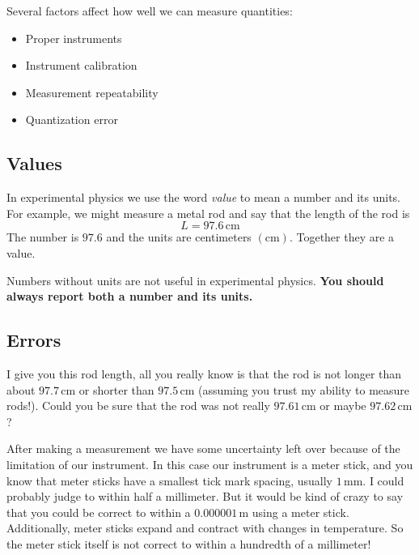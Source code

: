 \documentclass[twoside,11pt,ShortChapTitles]{BYUTextbook}
\begin{document}
Several factors affect how well we can measure quantities:

\begin{itemize}
\item Proper instruments

\item Instrument calibration

\item Measurement repeatability

\item Quantization error
\end{itemize}



\subsection{Values}

In experimental physics we use the word \emph{value} to mean a number and its
units. For example, we might measure a metal rod and say that the length of
the rod is
\[
L=97.6\,\text{cm}
\]
The number is $97.6$ and the units are centimeters $\left(\text{cm}\right)$. Together they are a value.

Numbers without units are not useful in experimental physics. \textbf{You
should always report both a number and its units.}

\subsection{Errors}

I give you this rod length, all you really know is that the rod is not longer
than about $97.7\,\text{cm} $ or shorter than $97.5\,\text{cm} $ (assuming you trust my ability to measure rods!). Could you be sure that the
rod was not really $97.61\,\text{cm} $ or maybe $97.62\,\text{cm} $?

After making a measurement we have some uncertainty left over because of the
limitation of our instrument. In this case our instrument is a meter stick,
and you know that meter sticks have a smallest tick mark spacing, usually $1\,\text{mm} .$ I could probably judge to within half a millimeter. But it would be kind of
crazy to say that you could be correct to within a $0.000001\,\text{m} $ using a meter stick. Additionally, meter sticks expand and
contract with changes in temperature. So the meter stick itself is not
correct to within a hundredth of a millimeter!
\end{document}
